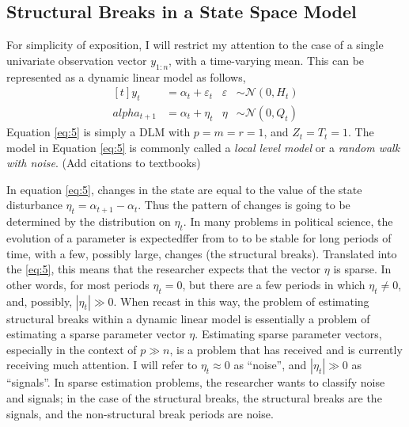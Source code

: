\documentclass{article}
\newcommand{\paren}[1]{\ensuremath{\left(#1\right)}}
\newcommand{\dnorm}[1]{\ensuremath{\mathcal{N}\paren{#1}}}
\begin{document}
\subsection{Structural Breaks in a State Space Model}
\label{sec:struct-breaks-state}

For simplicity of exposition, I will restrict my attention to the case of a single univariate observation vector $y_{1:n}$, with a time-varying mean.
This can be represented as a dynamic linear model as follows,
\begin{equation}
  \label{eq:5}
  \begin{aligned}[t]
    y_{t} &= \alpha_{t} + \varepsilon_{t} & \varepsilon & \sim \dnorm{0, H_{t}} \\
    alpha_{t + 1} &= \alpha_{t} + \eta_{t} & \eta & \sim \dnorm{0, Q_{t}}
  \end{aligned}
\end{equation}
Equation \eqref{eq:5} is simply a DLM with $p = m = r = 1$, and $Z_{t} = T_{t} = 1$.
The model in Equation \eqref{eq:5} is commonly called a \textit{local level model} or a \textit{random walk with noise}. (Add citations to textbooks)

In equation \eqref{eq:5}, changes in the state are equal to the value of the state disturbance $\eta_{t} = \alpha_{t+1} - \alpha_{t}$. 
Thus the pattern of changes is going to be determined by the distribution on $\eta_{t}$.
In many problems in political science, the evolution of a parameter is expectedffer from to to be stable for long periods of time, with a few, possibly large, changes (the structural breaks).
Translated into the \eqref{eq:5}, this means that the researcher expects that the vector $\eta$ is sparse. 
In other words, for most periods $\eta_{t} = 0$, but there are a few periods in which $\eta_{t} \neq 0$, and, possibly,  $|\eta_{t}| \gg 0$.
When recast in this way, the problem of estimating structural breaks within a dynamic linear model is essentially a problem of estimating a sparse parameter vector $\eta$.
Estimating sparse parameter vectors, especially in the context of $p \gg n$, is a problem that has received and is currently receiving much attention.
I will refer to $\eta_{t} \approx 0$ as ``noise'', and $|\eta_{t}| \gg 0$ as ``signals''. 
In sparse estimation problems, the researcher wants to classify noise and signals; in the case of the structural breaks, the structural breaks are the signals, and the non-structural break periods are noise.
\end{document}
